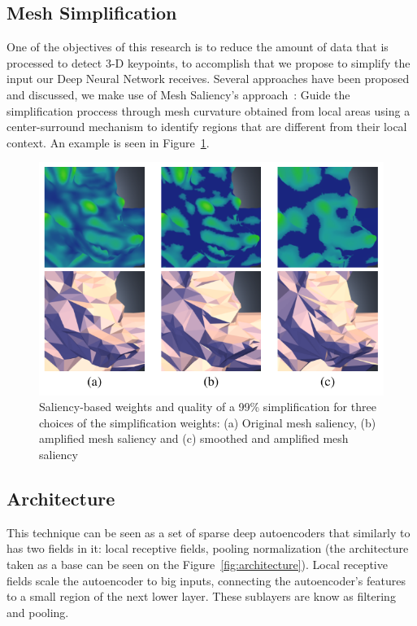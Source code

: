 \documentclass{comjnl}
\begin{document}
\subsection{Mesh Simplification}
One of the objectives of this research is to reduce the amount of data
that is processed to detect 3-D keypoints, to accomplish that we propose 
to simplify the input our Deep Neural Network receives. Several approaches
have been proposed and discussed, we make use of Mesh Saliency's
approach~\cite{Lee01}: Guide the simplification proccess through mesh
curvature obtained from local areas using a center-surround mechanism
to identify regions that are different from their local context. An example
is seen in Figure~\ref{fig:simplification}.

\begin{figure}
\centering
\includegraphics[width=1\linewidth]{figures/mesh_simplification.png}
\caption{Saliency-based weights and quality of a 99\% simplification
for three choices of the simplification weights: (a) Original mesh saliency,
(b) amplified mesh saliency and (c) smoothed and amplified mesh saliency~\cite{Lee01}}
\label{fig:simplification}
\end{figure}  

\subsection{Architecture}
This technique can be seen as a set of sparse deep autoencoders that
similarly to~\cite{UnsLearning} has two fields in it: local receptive fields,
pooling normalization (the architecture taken as a base can be seen
on the Figure~\ref{fig:architecture}). Local receptive fields scale the
autoencoder to big inputs, connecting the autoencoder's features to a small
region of the next lower layer. These sublayers are know as filtering and
pooling.
\end{document}
